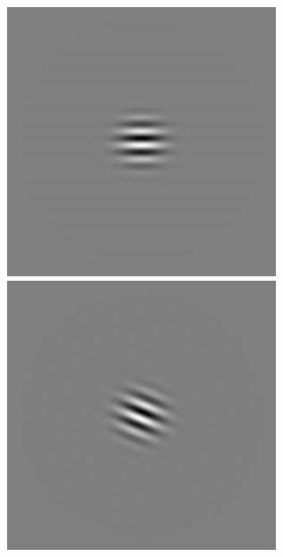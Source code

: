 \begin{figure}[ht]
\begin{center}
 \includegraphics[width=\columnwidth/9]{ch4/figures/iGabor3_4.jpg}
 \includegraphics[width=\columnwidth/9]{ch4/figures/iGabor3_5.jpg}

\end{center}
\end{figure}
